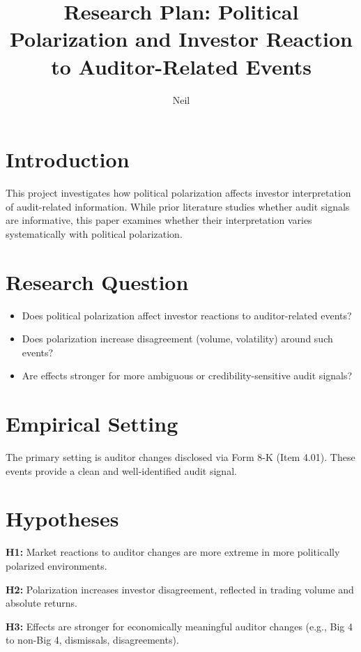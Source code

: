 \documentclass[12pt]{article}
\title{Research Plan: Political Polarization and Investor Reaction to Auditor-Related Events}
\author{Neil}
\date{}
\begin{document}
\maketitle
\onehalfspacing

\section{Introduction}

This project investigates how political polarization affects investor interpretation of audit-related information. While prior literature studies whether audit signals are informative, this paper examines whether their interpretation varies systematically with political polarization.

\section{Research Question}

\begin{itemize}
\item Does political polarization affect investor reactions to auditor-related events?
\item Does polarization increase disagreement (volume, volatility) around such events?
\item Are effects stronger for more ambiguous or credibility-sensitive audit signals?
\end{itemize}

\section{Empirical Setting}

The primary setting is auditor changes disclosed via Form 8-K (Item 4.01). These events provide a clean and well-identified audit signal.

\section{Hypotheses}

\textbf{H1:} Market reactions to auditor changes are more extreme in more politically polarized environments.

\textbf{H2:} Polarization increases investor disagreement, reflected in trading volume and absolute returns.

\textbf{H3:} Effects are stronger for economically meaningful auditor changes (e.g., Big 4 to non-Big 4, dismissals, disagreements).
\end{document}
